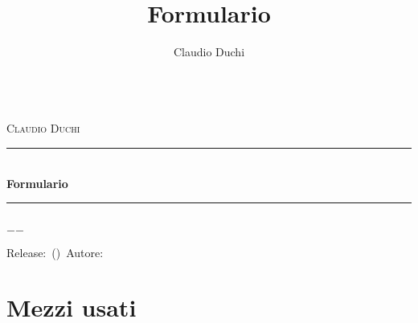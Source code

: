 \documentclass[a4paper,oneside]{book}%
\title{Formulario}
\author{Claudio Duchi}
\date{\datetime}
\makeatletter
\theoremstyle{marginbreak}
\theoremstyle{plain}
\theoremstyle{nonumberplain}
\newcommand{\HRule}{\rule{\linewidth}{0.5mm}}
\renewcommand\frontmatter{%
 	\cleardoublepage
 	\@mainmatterfalse
 }
\renewcommand\mainmatter{%
 	\cleardoublepage
 	\@mainmattertrue
 }
\makeatother
\begin{document}
		\frontmatter
		\begin{titlepage}\parindent=0pt
		\begin{center}
					\Lgrandedue\\[1cm]
			\textsc{\LARGE Claudio Duchi}\\[1.2cm]
				\HRule \\[0.4cm]
				{ \huge \bfseries Formulario}\\[0.4cm]
				\HRule \\[1.2cm]
				\vfill
			{\large $-$\DTMnow$-$}	
		\end{center}
		{\centering
	Release:\gitReln\ (\gitAbbrevHash)\ Autore:\gitAuthorName\ 
	\gitCommitterDate \\
}
		\end{titlepage}
	\hypersetup{pageanchor=true}
	\CDcopyright
		\tableofcontents
	\listoffigures
			\listoftables
			\mainmatter
		
\backmatter	
 \printindex
\appendix
\chapter{Mezzi usati}
\CDMezziUsati
	\twocolumn
\glsaddall
\printglossaries
\onecolumn
\nocite{*}
\printbibliography
\end{document}
